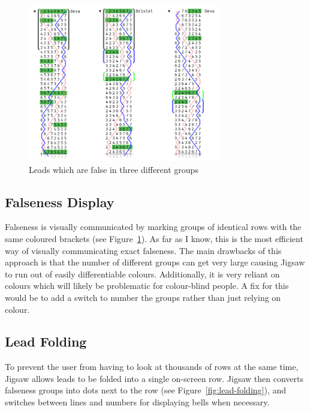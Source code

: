 \documentclass[12pt]{article}
\begin{document}
\begin{figure}
    \centering
    \includegraphics[width=0.75\textwidth]{falseness-clean}
    \caption{Leads which are false in three different groups}\label{fig:falseness}
\end{figure}

\subsection{Falseness Display}

Falseness is visually communicated by marking groups of identical rows with the same coloured
brackets (see Figure~\ref{fig:falseness}).  As far as I know, this is the most efficient way of
visually communicating exact falseness.  The main drawbacks of this approach is that the number of
different groups can get very large causing Jigsaw to run out of easily differentiable colours.
Additionally, it is very reliant on colours which will likely be problematic for colour-blind
people.  A fix for this would be to add a switch to number the groups rather than just relying on
colour.

\subsection{Lead Folding}

To prevent the user from having to look at thousands of rows at the same time, Jigsaw allows leads
to be folded into a single on-screen row.  Jigsaw then converts falseness groups into dots next to the row
(see Figure~\ref{fig:lead-folding}), and switches between lines and numbers for displaying
bells when necessary.
\end{document}
